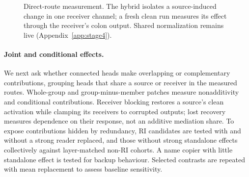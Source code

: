 \begin{figure}[t]
\centering
{}
\caption{Direct-route measurement. The hybrid isolates a source-induced change
in one receiver channel; a fresh clean run measures its effect through the
receiver's colon output. Shared normalization remains live
(Appendix~\ref{app:stage4}).}
\label{fig:route}
\end{figure}

\paragraph{Joint and conditional effects.}
We next ask whether connected heads make overlapping or complementary
contributions, grouping heads that share a source or receiver in the measured
routes. Whole-group and
group-minus-member patches measure nonadditivity and conditional contributions.
Receiver blocking restores a source's clean activation while clamping its
receivers to corrupted outputs; lost recovery measures dependence on their
response, not an additive mediation share. To expose contributions hidden by
redundancy, RI candidates are tested with and without a strong reader replaced,
and those without strong
standalone effects collectively against layer-matched non-RI cohorts. A name
copier with little standalone effect is tested for backup behaviour. Selected
contrasts are repeated with mean replacement to assess baseline sensitivity.

